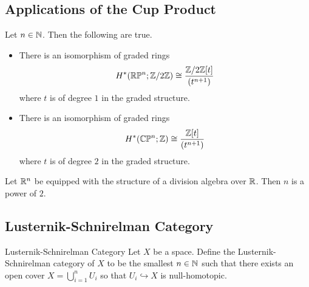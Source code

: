 \documentclass[a4paper]{article}
\begin{document}
\subsection{Applications of the Cup Product}
\begin{prp}{}{} Let $n\in\mathbb{N}$. Then the following are true. 
\begin{itemize}
\item There is an isomorphism of graded rings $$H^\ast(\mathbb{R}\mathbb{P}^n;\mathbb{Z}/2\mathbb{Z})\cong\frac{\mathbb{Z}/2\mathbb{Z}[t]}{(t^{n+1})}$$ where $t$ is of degree $1$ in the graded structure. 
\item There is an isomorphism of graded rings $$H^\ast(\mathbb{C}\mathbb{P}^n;\mathbb{Z})\cong\frac{\mathbb{Z}[t]}{(t^{n+1})}$$ where $t$ is of degree $2$ in the graded structure. 
\end{itemize}
\end{prp}

\begin{prp}{}{} Let $\mathbb{R}^n$ be equipped with the structure of a division algebra over $\mathbb{R}$. Then $n$ is a power of $2$. 
\end{prp}


\subsection{Lusternik-Schnirelman Category}
\begin{defn}{Lusternik-Schnirelman Category}{} Let $X$ be a space. Define the Lusternik-Schnirelman category of $X$ to be the smallest $n\in\mathbb{N}$ such that there exists an open cover $X=\bigcup_{i=1}^nU_i$ so that $U_i\hookrightarrow X$ is null-homotopic. 
\end{defn}
\end{document}
